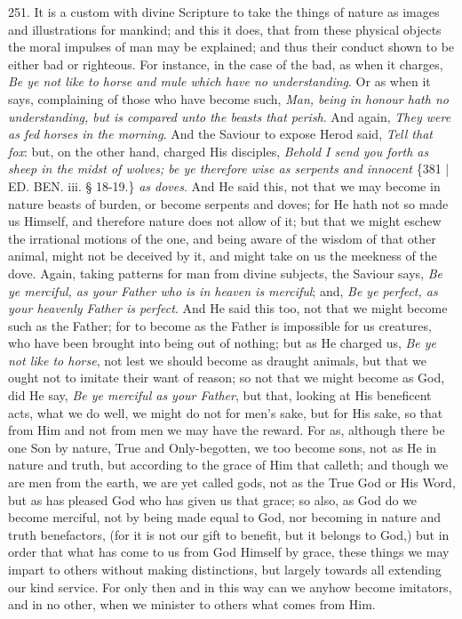251. It is a
custom with divine Scripture to take the things of nature as images
and illustrations for mankind; and this it does, that from these
physical objects the moral impulses of man may be explained; and thus
their conduct shown to be either bad or righteous. For instance, in
the case of the bad, as when it charges, \emph{Be ye not like to horse
and mule which have no understanding}. Or as when it says,
complaining of those who have become such, \emph{Man, being in honour
hath no understanding, but is compared unto the beasts that perish}.
And again, \emph{They were as fed horses in the morning}. And the
Saviour to expose Herod said, \emph{Tell that fox}: but, on the other
hand, charged His disciples, \emph{Behold I send you forth as sheep in
the midst of wolves; be ye therefore wise as serpents and innocent}
\{381 | ED.
BEN.
iii. § 18-19.\} \emph{as doves}. And He said this, not that we may
become in nature beasts of burden, or become serpents and doves; for
He hath not so made us Himself, and therefore nature does not allow of
it; but that we might eschew the irrational motions of the one, and
being aware of the wisdom of that other animal, might not be deceived
by it, and might take on us the meekness of the dove. Again, taking
patterns for man from divine subjects, the Saviour says, \emph{Be ye
merciful, as your Father who is in heaven is merciful}; and, \emph{Be
ye perfect, as your heavenly Father is perfect}. And He said this
too, not that we might become such as the Father; for to become as the
Father is impossible for us creatures, who have been brought into
being out of nothing; but as He charged us, \emph{Be ye not like to horse},
not lest we should become as draught animals, but that we ought not to
imitate their want of reason; so not that we might become as God, did
He say, \emph{Be ye merciful as your Father}, but that, looking at His
beneficent acts, what we do well, we might do not for men's sake, but
for His sake, so that from Him and not from men we may have the
reward. For as, although there be one Son by nature, True and
Only-begotten, we too become sons, not as He in nature and truth, but
according to the grace of Him that calleth; and though we are men from
the earth, we are yet called gods, not as the True God or His Word,
but as has pleased God who has given us that grace; so also, as God do
we become merciful, not by being made equal to God, nor becoming in
nature and truth benefactors, (for it is not our gift to benefit, but
it belongs to God,) but in order that what has come to us from God
Himself by grace, these things we may impart to others without making
distinctions, but largely towards all extending our kind service. For
only then and in this way can we anyhow become imitators, and in no
other, when we minister to others what comes from Him.


